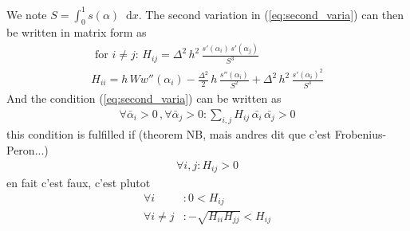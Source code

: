 \documentclass[final,3p,times,authoryear]{elsarticle}
\renewcommand*\d{\mathop{}\!\mathrm{d}} %
\begin{document}
We note $S=\int_0^1 s(\alpha) \d x$. The second variation in (\ref{eq:second_varia}) can then be written in matrix form as
\begin{subequations}
\begin{align}
\label{eq:second_varia_discrete}
\text{ for } i \neq j: \, H_{ij} = \Delta^2 \, h^2 \,  \frac{s'(\alpha_i) \, s'(\alpha_j)}{S^3} \\
%
H_{ii} = h\, W w''(\alpha_i) - \frac{\Delta^2}{2} \, h \,  \frac{s''(\alpha_i)}{S^2}  + \Delta^2 \, h^2 \,  \frac{s'(\alpha_i)^2}{S^3}
\end{align}
\end{subequations}
And the condition (\ref{eq:second_varia}) can be written as
\begin{align}
\label{eq:cond_second_varia_discrete}
\forall  \bar{\alpha}_i >0 \, , \forall  \bar{\alpha}_j >0  : \sum_{i,j} H_{ij} \, \bar{\alpha_i} \, \bar{{\alpha_j}} >0
\end{align}
this condition is fulfilled if (theorem NB, mais andres dit que c'est Frobenius-Peron...)
\begin{align}
\label{eq:cond_second_varia_discrete_bis}
\forall  i,j  :  H_{ij} >0
\end{align}
en fait c'est faux, c'est plutot
\begin{subequations}
\begin{align}
\label{eq:cond_second_varia_discrete_bis}
\forall  i  &:  0 < H_{ij}  \\
\forall  i \neq j  &:  - \sqrt{H_{ii} H_{jj} } < H_{ij}
\end{align}
\end{subequations}




%
%
%
%
%
%
%
%
%





\end{document}
